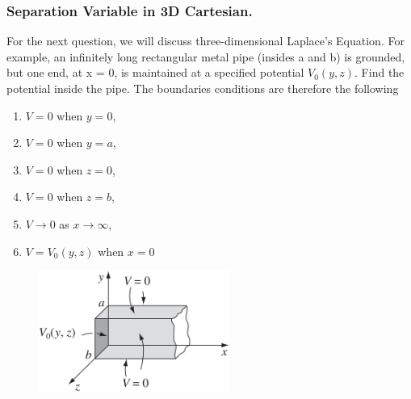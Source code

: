 \documentclass[../../../main.tex]{subfiles}
\begin{document}
\subsubsection*{Separation Variable in 3D Cartesian.} For the next question, we will discuss three-dimensional Laplace's Equation. For example, an infinitely long rectangular metal pipe (insides a and b) is grounded, but one end, at x = 0, is maintained at a specified potential $V_0(y, z)$. Find the potential inside the pipe. The boundaries conditions are therefore the following
\begin{enumerate}
    \item $V = 0$ when $y = 0$,
    \item $V = 0$ when $y = a$,
    \item $V = 0$ when $z = 0$,
    \item $V = 0$ when $z = b$,
    \item $V \rightarrow 0$ as $x \rightarrow \infty$,
    \item$ V = V_0(y, z)$ when $x = 0$
\end{enumerate}
\begin{figure}[ht]
    \centering
    \includegraphics[height=4cm]{../Rss/Electromagnetism/Potential/CartesianSepVar2.png}
\end{figure}
\end{document}
